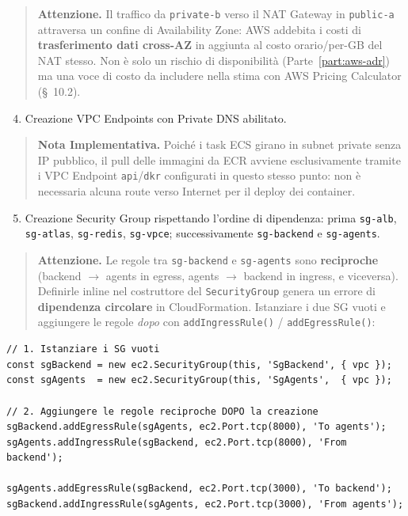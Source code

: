 \documentclass[11pt,a4paper]{article}
\begin{document}
\begin{quote}
\textbf{Attenzione.} Il traffico da \texttt{private-b} verso il NAT Gateway in \texttt{public-a} attraversa un confine di Availability Zone: AWS addebita i costi di \textbf{trasferimento dati cross-AZ} in aggiunta al costo orario/per-GB del NAT stesso. Non è solo un rischio di disponibilità (Parte~\ref{part:aws-adr}) ma una voce di costo da includere nella stima con AWS Pricing Calculator (\S~10.2).
\end{quote}

\begin{enumerate}
    \setcounter{enumi}{3}
    \item Creazione VPC Endpoints con Private DNS abilitato.
\end{enumerate}

\begin{quote}
\textbf{Nota Implementativa.} Poiché i task ECS girano in subnet private senza IP pubblico, il pull delle immagini da ECR avviene esclusivamente tramite i VPC Endpoint \texttt{api}/\texttt{dkr} configurati in questo stesso punto: non è necessaria alcuna route verso Internet per il deploy dei container.
\end{quote}

\begin{enumerate}
    \setcounter{enumi}{4}
    \item Creazione Security Group rispettando l'ordine di dipendenza: prima \texttt{sg-alb}, \texttt{sg-atlas}, \texttt{sg-redis}, \texttt{sg-vpce}; successivamente \texttt{sg-backend} e \texttt{sg-agents}.
\end{enumerate}

\begin{quote}
\textbf{Attenzione.} Le regole tra \texttt{sg-backend} e \texttt{sg-agents} sono \textbf{reciproche} (backend $\to$ agents in egress, agents $\to$ backend in ingress, e viceversa). Definirle inline nel costruttore del \texttt{SecurityGroup} genera un errore di \textbf{dipendenza circolare} in CloudFormation. Istanziare i due SG vuoti e aggiungere le regole \emph{dopo} con \texttt{addIngressRule()} / \texttt{addEgressRule()}:
\end{quote}

\begin{lstlisting}[caption={Pattern corretto per evitare dipendenza circolare tra SG}]
// 1. Istanziare i SG vuoti
const sgBackend = new ec2.SecurityGroup(this, 'SgBackend', { vpc });
const sgAgents  = new ec2.SecurityGroup(this, 'SgAgents',  { vpc });

// 2. Aggiungere le regole reciproche DOPO la creazione
sgBackend.addEgressRule(sgAgents, ec2.Port.tcp(8000), 'To agents');
sgAgents.addIngressRule(sgBackend, ec2.Port.tcp(8000), 'From backend');

sgAgents.addEgressRule(sgBackend, ec2.Port.tcp(3000), 'To backend');
sgBackend.addIngressRule(sgAgents, ec2.Port.tcp(3000), 'From agents');
\end{lstlisting}
\end{document}
